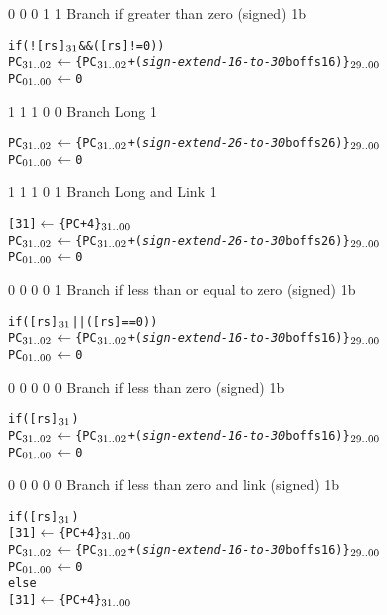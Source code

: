      {0 0 0 1 1} {Branch if greater than zero (signed)}    {1b}   {\RawTag}
\begin{alltt}
        if (![rs]\(\sb{31}\) && ([rs] != 0))
           PC\({\sb{31..02}}\) \(\leftarrow\) \{ PC\({\sb{31..02}}\) + ({\em{sign-extend-16-to-30}} boffs16) \}\(\sb{29..00}\)
           PC\({\sb{01..00}}\) \(\leftarrow\) 0
\end{alltt}\rawInstrEnd

    {1 1 1 0 0}    {Branch Long}                  {1}    {\RawTagH}
\begin{alltt}
        PC\({\sb{31..02}}\) \(\leftarrow\) \{ PC\({\sb{31..02}}\) + ({\em{sign-extend-26-to-30}} boffs26) \}\(\sb{29..00}\)
        PC\({\sb{01..00}}\) \(\leftarrow\) 0
\end{alltt}\rawInstrEnd

    {1 1 1 0 1}    {Branch Long and Link}            {1}    {\RawTagH}
\begin{alltt}
        [31]   \(\leftarrow\) \{ PC + 4 \}\(\sb{31..00}\)
        PC\({\sb{31..02}}\) \(\leftarrow\) \{ PC\({\sb{31..02}}\) + ({\em{sign-extend-26-to-30}} boffs26) \}\(\sb{29..00}\)
        PC\({\sb{01..00}}\) \(\leftarrow\) 0
\end{alltt}\rawInstrEnd

     {0 0 0 0 1} {Branch if less than or equal to zero (signed)}    {1b}   {\RawTag}
\begin{alltt}
        if ([rs]\(\sb{31}\) || ([rs] == 0))
           PC\({\sb{31..02}}\) \(\leftarrow\) \{ PC\({\sb{31..02}}\) + ({\em{sign-extend-16-to-30}} boffs16) \}\(\sb{29..00}\)
           PC\({\sb{01..00}}\) \(\leftarrow\) 0
\end{alltt}\rawInstrEnd

     {0 0 0 0 0} {Branch if less than zero (signed)}    {1b}   {\RawTag}
\begin{alltt}
        if ([rs]\(\sb{31}\))
           PC\({\sb{31..02}}\) \(\leftarrow\) \{ PC\({\sb{31..02}}\) + ({\em{sign-extend-16-to-30}} boffs16) \}\(\sb{29..00}\)
           PC\({\sb{01..00}}\) \(\leftarrow\) 0
\end{alltt}\rawInstrEnd

     {0 0 0 0 0} {Branch if less than zero and link (signed)}    {1b}   {\RawTag}
\begin{alltt}
        if ([rs]\(\sb{31}\))
           [31]   \(\leftarrow\) \{ PC + 4 \}\(\sb{31..00}\)
           PC\({\sb{31..02}}\) \(\leftarrow\) \{ PC\({\sb{31..02}}\) + ({\em{sign-extend-16-to-30}} boffs16) \}\(\sb{29..00}\)
           PC\({\sb{01..00}}\) \(\leftarrow\) 0
        else
           [31]   \(\leftarrow\) \{ PC + 4 \}\(\sb{31..00}\)
\end{alltt}\rawInstrEnd

